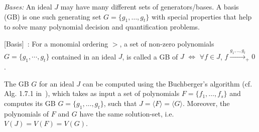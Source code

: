 

{\it \Grobner Bases:} An ideal $J$ may have many different sets of 
generators/bases. %
A \Grobner basis (GB) is one such generating set $G=\{g_1, \dots,
g_t\}$ with special properties that help to solve
many polynomial decision and quantification problems. 

\begin{Definition}
\label{def:gb}
{[\Grobner Basis]}~\cite{gb_book}: 
For a monomial ordering $>$, a set of non-zero polynomials $G =
\{g_1,\cdots,g_t\}$ contained in an ideal $J$, is called a
GB of $J$ $\iff$
$\forall f \in J$, $f\xrightarrow{g_1,..,g_t}_+0$. 
\end{Definition}
The GB $G$ for an ideal $J$ can be computed using the Buchberger's
algorithm  %
(cf. Alg. 1.7.1 in~\cite{gb_book}), which
takes as input a set of polynomials $F = \{f_1,\dots, f_s\}$ and
computes its GB $G = \{g_1,\dots,g_t\}$, such that $J = \langle
F\rangle = \langle G\rangle$. Moreover, the polynomials of $F$ and $G$
have the same solution-set, i.e. $V(J) = V(F) = V(G)$. 



